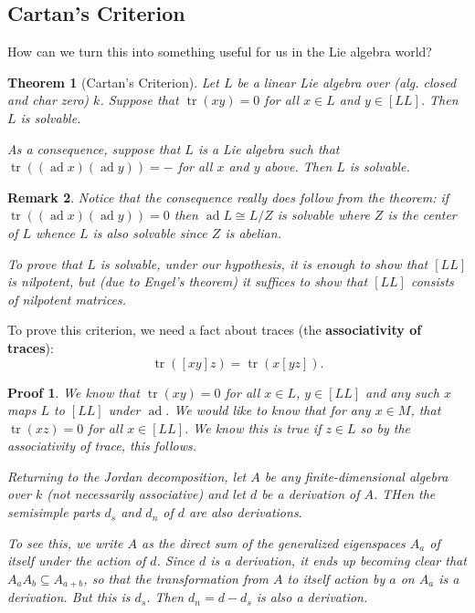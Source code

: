 \documentclass[12pt]{article}
\theoremstyle{nonumberbreak}
\theoremstyle{changebreak}
\newtheorem{thm}{Theorem}[subsection]
\theoremstyle{nonumberbreak}
\newtheorem{prf}{Proof}
\theoremstyle{change}
\newtheorem{rmk}[thm]{Remark}
\DeclareMathOperator{\tr}{tr}
\DeclareMathOperator{\ad}{ad}
\begin{document}
\subsection{Cartan's Criterion}
How can we turn this into something useful for us in the Lie algebra world?
\begin{thm}[Cartan's Criterion]
	Let $L$ be a linear Lie algebra over (alg. closed and char zero) $k$. Suppose that $\tr(xy)=0$
	for all $x\in L$ and $y\in[LL]$. Then $L$ is solvable. 
	
	As a consequence, suppose that $L$ is a Lie algebra such that 
	$\tr((\ad x)(\ad y))=-$ for all $x$ and $y$ above. Then $L$ is solvable.
\end{thm}
\begin{rmk}
	Notice that the consequence really does follow from the theorem: if $\tr((\ad x)(\ad y))=0$
	then $\ad L\cong L/Z$ is solvable where $Z$ is the center of $L$ whence $L$ is also solvable
	since $Z$ is abelian.

	To prove that $L$ is solvable, under our hypothesis, it is enough to show that $[LL]$ is nilpotent, 
	but (due to Engel's theorem) it suffices to show that $[LL]$ consists of nilpotent matrices.
\end{rmk}
To prove this criterion, we need a fact about traces (the \textbf{associativity of traces}):
\[\tr([xy]z)=\tr(x[yz]).\]
\begin{prf}
	We know that $\tr(xy)=0$ for all $x\in L$, $y\in [LL]$ and any such $x$ maps $L$ to $[LL]$ under $\ad$.
	We would like to know that for any $x\in M$, that $\tr(xz)=0$ for all  $x\in[LL]$. We know this is true if $z\in L$
	so by the associativity of trace, this follows.

	Returning to the Jordan decomposition, let $A$ be any finite-dimensional algebra over $k$ (not necessarily associative)
	and let $d$ be a derivation of $A$. THen the semisimple parts $d_s$ and $d_n$ of $d$ are also derivations.

	To see this, we write $A$ as the direct sum of the generalized eigenspaces $A_a$ of itself under the action of $d$. Since $d$ is a derivation,
	it ends up becoming clear that $A_aA_b\subseteq A_{a+b}$, so that the transformation from $A$ to itself action by $a$ on $A_a$ is a derivation.
	But this is $d_s$. Then $d_n=d-d_s$ is also a derivation.
\end{prf}
\end{document}
